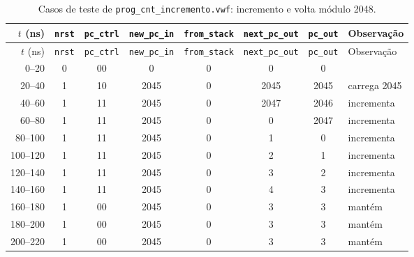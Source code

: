 {\scriptsize\setlength{\tabcolsep}{3pt}
\begin{longtable}{rccccccp{4.2cm}}
\caption{Casos de teste de \texttt{prog\_cnt\_incremento.vwf}: incremento e volta módulo 2048.}
\label{tab:caso-prog-cnt-incremento}\\
\hline $t$ (ns) & \texttt{nrst} & \texttt{pc\_ctrl} & \texttt{new\_pc\_in} & \texttt{from\_stack} & \texttt{next\_pc\_out} & \texttt{pc\_out} & Observação \\ \hline \endfirsthead
\hline $t$ (ns) & \texttt{nrst} & \texttt{pc\_ctrl} & \texttt{new\_pc\_in} & \texttt{from\_stack} & \texttt{next\_pc\_out} & \texttt{pc\_out} & Observação \\ \hline \endhead
0--20 & 0 & 00 & 0 & 0 & 0 & 0 &  \\
20--40 & 1 & 10 & 2045 & 0 & 2045 & 2045 & carrega 2045 \\
40--60 & 1 & 11 & 2045 & 0 & 2047 & 2046 & incrementa \\
60--80 & 1 & 11 & 2045 & 0 & 0 & 2047 & incrementa \\
80--100 & 1 & 11 & 2045 & 0 & 1 & 0 & incrementa \\
100--120 & 1 & 11 & 2045 & 0 & 2 & 1 & incrementa \\
120--140 & 1 & 11 & 2045 & 0 & 3 & 2 & incrementa \\
140--160 & 1 & 11 & 2045 & 0 & 4 & 3 & incrementa \\
160--180 & 1 & 00 & 2045 & 0 & 3 & 3 & mantém \\
180--200 & 1 & 00 & 2045 & 0 & 3 & 3 & mantém \\
200--220 & 1 & 00 & 2045 & 0 & 3 & 3 & mantém \\
\hline
\end{longtable}}
\vspace{-0.9cm}
